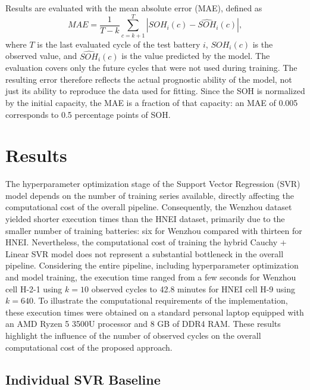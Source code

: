 \documentclass[conference]{IEEEtran}
\begin{document}
Results are evaluated with the mean absolute error (MAE), defined as
\begin{equation}
    MAE
    =
    \frac{1}{T-k}
    \sum_{c=k+1}^{T}
    \left|
        SOH_i(c)-\widehat{SOH}_i(c)
    \right|,
    \label{eq:mae}
\end{equation}
where $T$ is the last evaluated cycle of the test battery $i$, $SOH_i(c)$ is the observed value, and $\widehat{SOH}_i(c)$ is the value predicted by the model. The evaluation covers only the future cycles that were not used during training. The resulting error therefore reflects the actual prognostic ability of the model, not just its ability to reproduce the data used for fitting. Since the SOH is normalized by the initial capacity, the MAE is a fraction of that capacity: an MAE of 0.005 corresponds to 0.5 percentage points of SOH.


\section{Results}
\label{sec:resultados}


The hyperparameter optimization stage of the Support Vector Regression (SVR) model depends on the number of training series available, directly affecting the computational cost of the overall pipeline. Consequently, the Wenzhou dataset yielded shorter execution times than the HNEI dataset, primarily due to the smaller number of training batteries: six for Wenzhou compared with thirteen for HNEI. Nevertheless, the computational cost of training the hybrid Cauchy + Linear SVR model does not represent a substantial bottleneck in the overall pipeline. Considering the entire pipeline, including hyperparameter optimization and model training, the execution time ranged from a few seconds for Wenzhou cell H-2-1 using $k=10$ observed cycles to 42.8 minutes for HNEI cell H-9 using $k=640$. To illustrate the computational requirements of the implementation, these execution times were obtained on a standard personal laptop equipped with an AMD Ryzen 5 3500U processor and 8 GB of DDR4 RAM. These results highlight the influence of the number of observed cycles on the overall computational cost of the proposed approach.


\subsection{Individual SVR Baseline}
\label{subsec:individual_baseline}
\end{document}
